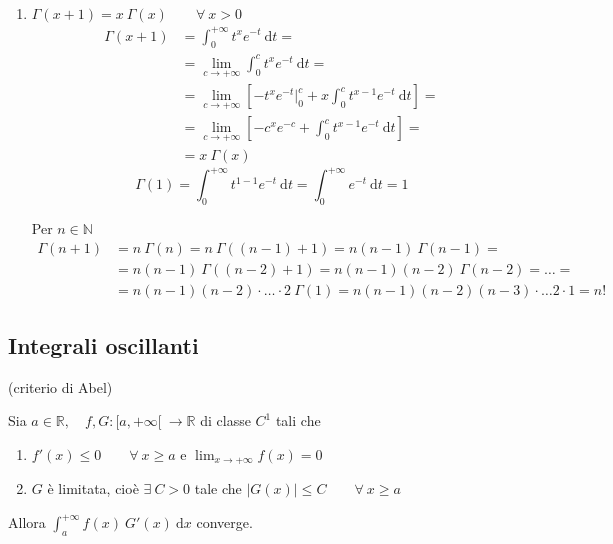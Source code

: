 \begin{exbar}
\begin{example}
\begin{enumerate}
		\item $\Gamma(x+1) = x \ \Gamma(x) \qquad \forall \ x > 0$
		\begin{align*}
			\Gamma(x+1)
			&=\int_{0}^{+\infty} t^{x} e^{-t} \ \mathrm{d}t =
			\\
			&=  \lim_{c \rightarrow + \infty} \int_{0}^{c} t^{x} e^{-t} \ \mathrm{d}t =
			\\
			&= \lim_{c \rightarrow + \infty} \left[ -t^x e^{-t} \bigg|_{0}^c + x \int_{0}^{c} t^{x-1} e^{-t} \ \mathrm{d}t \right] = 
			\\
			&= \lim_{c \rightarrow + \infty} \left[ -c^x e^{-c} + \int_{0}^{c} t^{x-1} e^{-t} \ \mathrm{d}t \right] = 
			\\
			&= x \ \Gamma(x)
		\end{align*}
		\begin{equation*}
			\Gamma(1) = \int_{0}^{+\infty} t^{1 - 1} e^{-t} \ \mathrm{d}t = \int_{0}^{+\infty} e^{-t} \ \mathrm{d}t = 1
		\end{equation*}
		
		Per $n \in \mathbb{N}$
		\begin{align*}
			\Gamma(n+1)
			&= n \ \Gamma(n) = n \ \Gamma((n-1)+1) = n (n-1) \ \Gamma(n-1) =
			\\
			&= n(n-1) \ \Gamma((n-2)+1) = n(n-1)(n-2) \ \Gamma(n-2) = \ldots =
			\\
			&= n(n-1)(n-2) \cdot \ldots \cdot 2 \ \Gamma(1) = n(n-1)(n-2)(n-3) \cdot \ldots 2 \cdot 1 = n!    
		\end{align*}
	\end{enumerate}
\end{example}
\end{exbar}


\subsection{Integrali oscillanti}
\begin{theorem} (criterio di Abel)
\label{th: criterio di Abel}

Sia  $a \in \mathbb{R}, \quad f,G : [a,+\infty[ \ \rightarrow \mathbb{R}$ di classe $C^1$ tali che
\begin{enumerate}
	\item $f'(x) \leq 0 \qquad \forall \ x \geq a$ e $\lim_{x \rightarrow +\infty} f(x) = 0$
	\item $G$ è limitata, cioè $\exists \ C > 0$ tale che $ |G(x)| \leq C \qquad \forall \ x \geq a$
\end{enumerate}

Allora $\int_{a}^{+\infty} f(x) \ G'(x) \ \mathrm{d}x$ converge.
\end{theorem}


